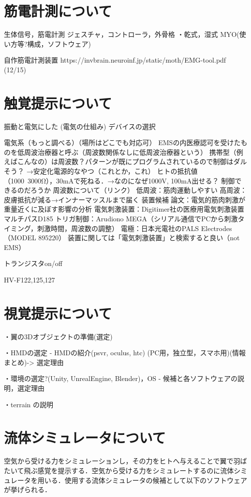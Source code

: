 \section{筋電計測について}
    生体信号，筋電計測
    ジェスチャ，コントローラ，外骨格
    ・乾式，湿式
    MYO(使い方等?構成，ソフトウェア)

    自作筋電計測装置
    https://invbrain.neuroinf.jp/static/moth/EMG-tool.pdf
    (12/15)





\section{触覚提示について}
    振動と電気にした
    (電気の仕組み)
    デバイスの選択

    電気系（もっと調べる）（場所はどこでも対応可）
EMSの内医療認可を受けたものを低周波治療器と呼ぶ（周波数関係なしに低周波治療器という）
携帯型（例えばこんなの）は周波数？パターンが既にプログラムされているので制御はダルそう？
→安定化電源的なやつ（これとか，これ）
ヒトの抵抗値（1000~3000Ω），30mAで死ねる．→なのになぜ1000V, 100mA出せる？
制御できるのだろうか
周波数について（リンク）
低周波：筋肉運動しやすい
高周波：皮膚抵抗が減る→インナーマッスルまで届く
装置候補
論文：電気的筋肉刺激が重量近くに及ぼす影響の分析
電気刺激装置：Digitimer社の医療用電気刺激装置マルチパスD185
トリガ制御：Arudiono MEGA（シリアル通信でPCから刺激タイミング，刺激時間，周波数の調整）
電極：日本光電社のPALS Electrodes（MODEL 895220）
装置に関しては「電気刺激装置」と検索すると良い（not EMS）


    トランジスタon/off

    HV-F122,125,127



    


\section{視覚提示について}
    ・翼の3Dオブジェクトの準備(選定)

    ・HMDの選定
        - HMDの紹介(psvr, oculus, htc) (PC用，独立型，スマホ用)(情報まとめ)-> 選定理由

    ・環境の選定?(Unity, UnrealEngine, Blender)，OS
        - 候補と各ソフトウェアの説明，選定理由

    ・terrain の説明



\section{流体シミュレータについて} 
    空気から受ける力をシミュレーションし，その力をヒトへ与えることで翼で羽ばたいて飛ぶ感覚を提示する．空気から受ける力をシミュレートするのに流体シミュレータを用いる．使用する流体シミュレータの候補として以下のソフトウェアが挙げられる．

